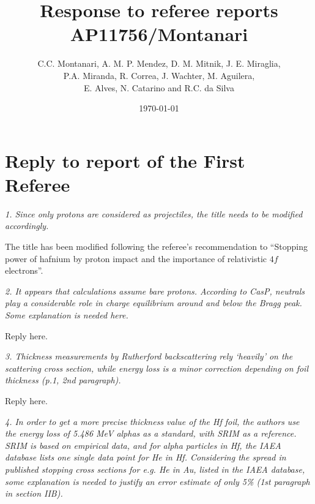 \documentclass[a4paper,10pt]{article}
\title{Response to referee reports \\ AP11756/Montanari }
\author{C.C. Montanari, A. M. P. Mendez, D. M. Mitnik, J. E. Miraglia, \\
P.A. Miranda, R. Correa, J. Wachter, M. Aguilera, \\
E. Alves, N. Catarino and R.C. da Silva}
\date{\today}
\begin{document}
\maketitle

\section{Reply to report of the First Referee}

\textsl{1. Since only protons are considered as projectiles, the title 
needs to be modified accordingly.}

\vspace{0.1cm}
The title has been modified following the referee's recommendation to
``Stopping power of hafnium by proton impact and the importance of 
relativistic $4f$ electrons''.

\vspace{0.25cm}
\textsl{2. It appears that calculations assume bare protons. According 
to CasP, neutrals play a considerable role in charge equilibrium around 
and below the Bragg peak. Some explanation is needed here.}

\vspace{0.1cm}
{\color{red}Reply here.}

\vspace{0.25cm}
\textsl{3. Thickness measurements by Rutherford backscattering rely 
‘heavily’ on the scattering cross section, while energy loss is a minor 
correction depending on foil thickness (p.1, 2nd paragraph).}

\vspace{0.1cm}
{\color{red}Reply here.}

\vspace{0.25cm}
\textsl{4. In order to get a more precise thickness value of the Hf 
foil, the authors use the energy loss of 5.486 MeV alphas as a standard, 
with SRIM as a reference. SRIM is based on empirical data, and for alpha 
particles in Hf, the IAEA database lists one single data point for He 
in Hf. Considering the spread in published stopping cross sections for 
e.g. He in Au, listed in the IAEA database, some explanation is needed 
to justify an error estimate of only 5\% (1st paragraph in section 
IIB).}
\end{document}
